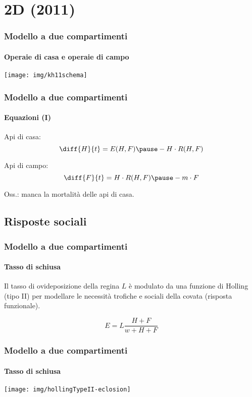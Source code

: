 \documentclass[]{beamer}
\begin{document}
\section{2D (2011)} %


\begin{frame}
    \frametitle{Modello a due compartimenti}
    \framesubtitle{Operaie di casa e operaie di campo}

    \cite{khoury2011}

    \pause
    \begin{center}
        \texttt{[image: img/kh11schema]}
    \end{center}
\end{frame}

\begin{frame}
    \frametitle{Modello a due compartimenti}
    \framesubtitle{Equazioni (I)}

    Api di casa:
    $$\diff{H}{t} = E(H,F) \pause - H \cdot R(H,F) $$

    \pause
    Api di campo:
    $$\diff{F}{t} = H \cdot R(H,F)  \pause - m \cdot F $$

    \pause
    Oss.: manca la mortalità delle api di casa.
\end{frame}


\subsection{Risposte sociali}


\begin{frame}
    \frametitle{Modello a due compartimenti}
    \framesubtitle{Tasso di schiusa}

    Il tasso di ovideposizione della regina $L$ è modulato da una funzione di Holling (tipo II)
    per modellare le necessità trofiche e sociali della covata (risposta funzionale).

    \pause
    $$E = L \frac{H+F}{w+H+F}$$

\end{frame}

\begin{frame}
    \frametitle{Modello a due compartimenti}
    \framesubtitle{Tasso di schiusa}

    \begin{center}
        \texttt{[image: img/hollingTypeII-eclosion]}
    \end{center}
\end{frame}
\end{document}
